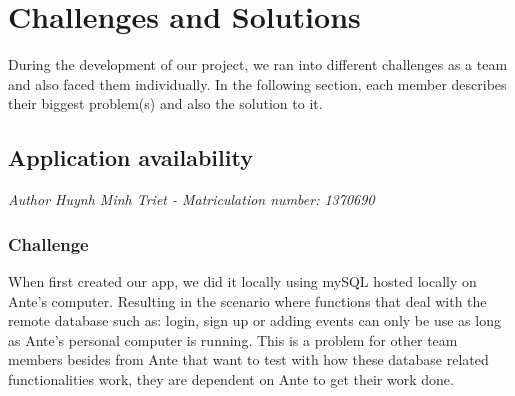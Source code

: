 \chapter{\centering Challenges and Solutions}

During the development of our project, we ran into different challenges as a team and also faced them individually.
In the following section, each member describes their biggest problem(s) and also the solution to it.


\section{Application availability}
\emph{Author Huynh Minh Triet - Matriculation number: 1370690}
\subsection{Challenge}
When first created our app, we did it locally using mySQL hosted locally on Ante's computer. Resulting in the scenario where functions that deal
with the remote database such as: login, sign up or adding events can only be use as long as Ante's personal computer is running. This is
a problem for other team members besides from Ante that want to test with how these database related functionalities work, they are dependent on Ante to get their work done.

